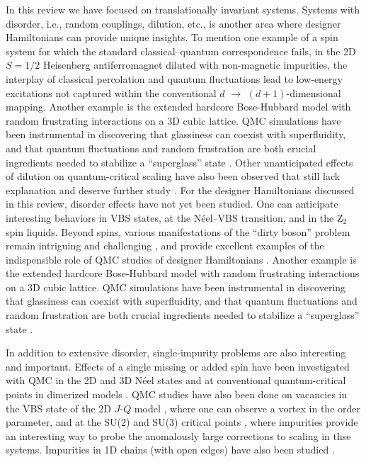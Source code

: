 \documentclass[range]{ar2e}
\begin{document}
In this review we have focused on translationally invariant systems. Systems with disorder, i.e., random couplings, dilution, etc., is another area
where designer Hamiltonians can provide unique insights. To mention one example of a spin system for which the standard classical--quantum correspondence 
fails, in the 2D $S=1/2$ Heisenberg antiferromagnet diluted with non-magnetic impurities, the interplay of classical percolation and quantum fluctuations 
lead to low-energy excitations \cite{Wang10} not captured \cite{Vojta05} within the conventional $d$ $\to$ $(d+1)$-dimensional mapping. 
Another example is the extended hardcore Bose-Hubbard model with random frustrating interactions on a 3D cubic lattice.  
QMC simulations have been instrumental in discovering that glassiness can coexist with superfluidity, and that quantum fluctuations
and random frustration are both crucial ingredients needed to stabilize a ``superglass'' state \cite{superglass1,superglass2}.
Other unanticipated effects
of dilution on quantum-critical scaling have also been observed that still lack explanation and deserve further study \cite{Sandvik06,Yao10}. 
For the designer Hamiltonians discussed in this review, disorder effects have not yet been studied. One can anticipate interesting behaviors in VBS states, 
at the N\'eel--VBS transition, and in the Z$_2$ spin liquids. 
Beyond spins, various manifestations of the ``dirty boson'' problem remain intriguing and challenging \cite{Pollet09,Meier12,Iyer12}, and provide excellent 
examples of the indispensible role of QMC studies of designer Hamiltonians \cite{Gurarie09}. Another example is the extended hardcore Bose-Hubbard model with 
random frustrating interactions on a 3D cubic lattice. QMC simulations have been instrumental in discovering that glassiness can coexist with superfluidity, 
and that quantum fluctuations and random frustration are both crucial ingredients needed to stabilize a ``superglass'' state \cite{superglass1,superglass2}.

In addition to extensive disorder, single-impurity problems are also interesting and important. Effects of a single missing or added spin have been
investigated with QMC in the 2D and 3D N\'eel states \cite{Hoglund04} and at conventional quantum-critical points in dimerized models \cite{Hoglund07}. 
QMC studies have also been done on vacancies in the VBS state of the 2D $J$-$Q$ model \cite{Kaul08}, where one can observe a vortex in the order parameter, 
and at the SU($2$) and SU($3$) critical points \cite{banerjee2010:log,banerjee2010:su3}, where impurities provide an interesting way to probe the anomalously 
large corrections to scaling in thse systems. Impurities in 1D chains (with open edges) have also been studied \cite{Sanyal11}.
\end{document}

